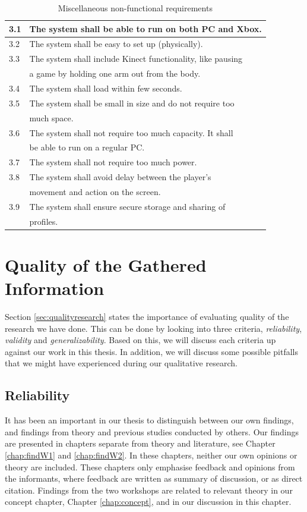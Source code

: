 \begin{table} [H]
\label{tab:nfunc2}
\centering
\begin{tabular}{|l|l|}
\hline
3.1 & The system shall be able to run on both PC and Xbox. \\ \hline
3.2 & The system shall be easy to set up (physically).\\ \hline
3.3 & The system shall include Kinect functionality, like pausing \\ & a game by holding one arm out from the body. \\ \hline
3.4 & The system shall load within few seconds.\\ \hline
3.5 & The system shall be small in size and do not require too \\&  much space.\\ \hline
3.6 & The system shall not require too much capacity. It shall \\ & be able to run on a regular PC. \\ \hline
3.7 & The system shall not require too much power. \\ \hline
3.8 & The system shall avoid delay between the player's \\ & movement and action on the screen.\\ \hline
3.9 & The system shall ensure secure storage and sharing of \\ & profiles. \\ \hline
\end{tabular}
\caption[Miscellaneous non-functional requirements]{Miscellaneous non-functional requirements}
\end{table} 

\section{Quality of the Gathered Information}
\label{sec:discQuality}

Section \ref{sec:qualityresearch} states the importance of evaluating quality of the research we have done. This can be done by looking into three criteria, \emph{reliability}, \emph{validity} and \emph{generalizability}. Based on this, we will discuss each criteria up against our work in this thesis. In addition, we will discuss some possible pitfalls that we might have experienced during our qualitative research.  

\subsection{Reliability}
It has been an important in our thesis to distinguish between our own findings, and findings from theory and previous studies conducted by others. Our findings are presented in chapters separate from theory and literature, see Chapter \ref{chap:findW1} and \ref{chap:findW2}. In these chapters, neither our own opinions or theory are included. These chapters only emphasise feedback and opinions from the informants, where feedback are written as summary of discussion, or as direct citation. Findings from the two workshops are related to relevant theory in our concept chapter, Chapter \ref{chap:concept}, and in our discussion in this chapter.

